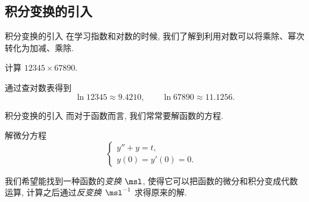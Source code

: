 
\subsection{积分变换的引入}

\begin{frame}{积分变换的引入}
	\onslide<+->
	在学习指数和对数的时候, 我们了解到利用对数可以将乘除、幂次转化为加减、乘除.
	\onslide<+->
	\begin{example}
		计算 $12345\times 67890$.
	\end{example}
	\onslide<+->
	\begin{solution}
		通过查对数表得到
	\[
			\ln 12345\approx 9.4210,\qquad\ln 67890\approx 11.1256.
	\]
		\vspace{-\baselineskip}
	\end{solution}
\end{frame}


\begin{frame}{积分变换的引入}
	\onslide<+->
	而对于函数而言, 我们常常要解函数的方程.
	\onslide<+->
	\begin{example}
		解微分方程
	\[
		\begin{cases}
			y''+y=t,&\\
			y(0)=y'(0)=0.&
		\end{cases}
	\]
	\end{example}
	\onslide<+->
	\begin{solution*}
			我们希望能找到一种函数的\emph{变换 $\msl$}, 使得它可以把函数的微分和积分变成代数运算, 计算之后通过\emph{反变换 $\msl^{-1}$} 求得原来的解.

	\end{solution*}
\end{frame}

